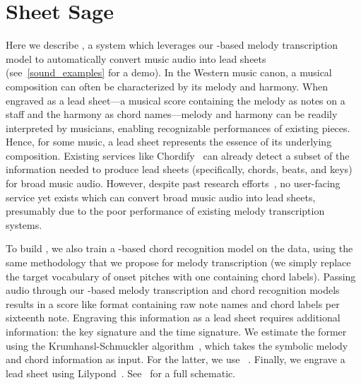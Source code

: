 \section{Sheet Sage}
\label{sec:sheetsage}

Here we describe \sheetsage, a system which leverages our \jukebox-based melody transcription model to automatically convert music audio into lead sheets (see~\cref{sound_examples} for a demo).  
In the Western music canon, a musical composition can often be characterized by its melody and harmony. 
When engraved as a lead sheet---a musical score containing the melody as notes on a staff and the harmony as chord names---melody and harmony can be readily interpreted by musicians, enabling recognizable performances of existing pieces. 
Hence, for some music, a lead sheet represents the essence of its underlying composition.
Existing services like Chordify~\cite{de2014chordify} can already detect a subset of the information needed to produce lead sheets (specifically, chords, beats, and keys) for broad music audio. 
However, despite past research efforts~\cite{ryynanen2008automatic,weil2009automatic}, no user-facing service yet exists which can convert broad music audio into lead sheets, presumably due to the poor performance of existing melody transcription systems.

To build \sheetsage, we also train a \jukebox-based chord recognition model on the \hooktheory{} data, using the same methodology that we propose for melody transcription (we simply replace the target vocabulary of onset pitches with one containing chord labels). 
Passing audio through our \jukebox{}-based melody transcription and chord recognition models results in a score like format containing raw note names and chord labels per sixteenth note. 
Engraving this information as a lead sheet requires additional information: the key signature and the time signature. 
We estimate the former using the Krumhansl-Schmuckler algorithm~\cite{krumhansl1990cognitive,temperley1999key}, which takes the symbolic melody and chord information as input. 
For the latter, we use \madmom~\cite{bock2016madmom,bock2016joint}. 
Finally, we engrave a lead sheet using Lilypond~\cite{nienhuys2003lilypond}. 
See~ for a full schematic.

